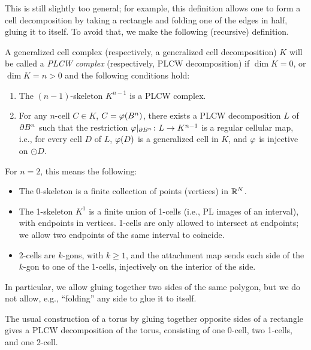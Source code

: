 This is still slightly too general; for example, this definition allows one
to form a cell decomposition by taking a rectangle and folding one of the
edges in half, gluing it to itself. To avoid that, we make the following
(recursive) definition.



\begin{definition}\label{d:PLCW}
  A generalized cell complex (respectively, a generalized cell
  decomposition) $K$ will be called a \emph{PLCW complex} (respectively, PLCW
  decomposition) if $\dim K=0$, or $\dim K=n>0$ and the following
  conditions hold:
  \begin{enumerate}
    \item The $(n-1)$-skeleton $K^{n-1}$ is a PLCW complex.
    \item For any $n$-cell $C\in K$, $C=\varphi(B^n)$, there exists a PLCW
    decomposition $L$ of $\partial B^n$ such that the restriction
    $\varphi|_{\partial B^n}\colon L\to K^{n-1}$ is a regular cellular map, i.e.,
    for every cell $D$ of $L$, $\varphi(D)$ is a generalized cell in $K$, and
    $\varphi$ is injective on $\odot{D}$.
  \end{enumerate}
\end{definition}

For $n=2$, this means the following:
\begin{itemize}
  \item The 0-skeleton is a finite collection of points (vertices) in $\mathbb{R}^N$.
  \item The 1-skeleton $K^1$ is a finite union of 1-cells (i.e., PL images of an
   interval), with endpoints in vertices. 1-cells are only allowed to
   intersect at endpoints; we allow two endpoints of the same interval
   to coincide.
  \item 2-cells are $k$-gons, with $k\ge 1$, and the attachment map sends each
   side of the $k$-gon to one of the 1-cells, injectively on the interior of the
   side.
\end{itemize}
In particular, we allow gluing together two sides of the same polygon, but
we do not allow, e.g., ``folding'' any side to glue it to itself.



\begin{example}\label{x:torus-plcw}
    The usual construction of a torus by gluing together opposite sides of a
    rectangle gives a PLCW decomposition of the torus, consisting of one 0-cell,
    two 1-cells, and one 2-cell.
\end{example}


